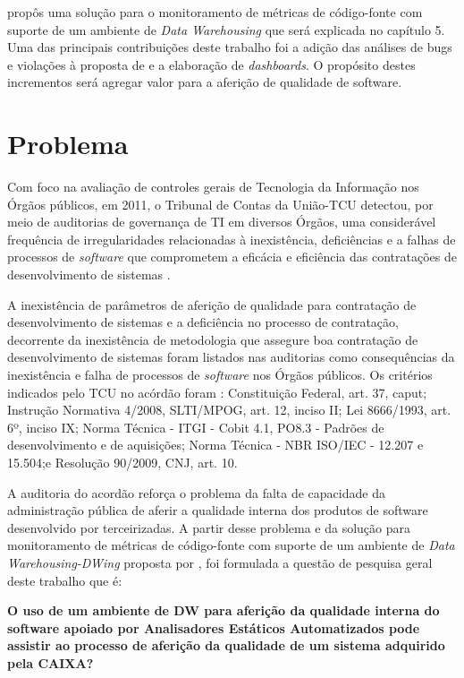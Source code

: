  propôs uma solução para o monitoramento de métricas de código-fonte com suporte de um ambiente de \textit{Data Warehousing} que será explicada no capítulo 5. Uma das principais contribuições deste trabalho foi a adição das análises de bugs e violações à proposta de  e a elaboração de \textit{dashboards}. O propósito destes incrementos será agregar valor para a aferição de qualidade de software. 


\section{Problema}
\label{problema} 

Com foco na avaliação de controles gerais de Tecnologia da Informação nos Órgãos públicos, em 2011, o Tribunal de Contas da União-TCU detectou, por meio de auditorias de governança de TI em diversos Órgãos, uma considerável frequência de irregularidades relacionadas à inexistência, deficiências e a falhas de processos de \textit{software} que comprometem a eficácia e eficiência das contratações de desenvolvimento de sistemas \cite{Acordao381_2011}. 

A inexistência de parâmetros de aferição de qualidade para contratação de desenvolvimento de sistemas e a deficiência no processo de contratação, decorrente da inexistência de metodologia que assegure boa contratação de desenvolvimento de sistemas foram listados nas auditorias como consequências da inexistência e falha de processos de \textit{software} nos Órgãos públicos. Os critérios indicados pelo TCU no acórdão \cite{Acordao381_2011} foram : Constituição Federal, art. 37, caput; Instrução Normativa 4/2008, SLTI/MPOG, art. 12, inciso II; Lei 8666/1993, art. 6º, inciso IX; Norma Técnica - ITGI - Cobit 4.1, PO8.3 - Padrões de desenvolvimento e de aquisições; Norma Técnica - NBR ISO/IEC - 12.207 e 15.504;e Resolução 90/2009, CNJ, art. 10. 

A auditoria do acordão \cite{Acordao381_2011} reforça o problema da falta de capacidade da administração pública de aferir a qualidade interna dos produtos de software desenvolvido por terceirizadas. A partir desse problema e da solução para monitoramento de métricas de código-fonte com suporte de um ambiente de \textit{Data Warehousing-DWing} proposta por , foi formulada a questão de pesquisa geral deste trabalho que é:

\textbf{O uso de um ambiente de DW para aferição da qualidade interna do software apoiado por Analisadores Estáticos Automatizados pode assistir ao processo de aferição da qualidade de um sistema adquirido pela CAIXA?}


